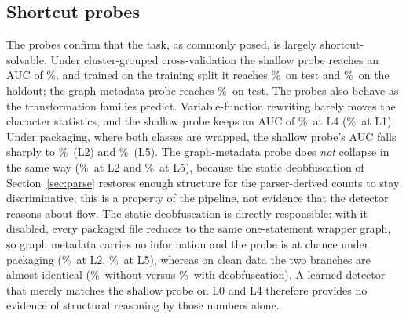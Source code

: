 \documentclass[pdflatex,sn-mathphys-num]{sn-jnl}
\begin{document}
\subsection{Shortcut probes}\label{sec:r-probe}
The probes confirm that the task, as commonly posed, is largely
shortcut-solvable. Under cluster-grouped cross-validation the shallow probe
reaches an AUC of \ProbeShallowAucCV\%, and trained on the training split it
reaches \ProbeShallowAucTest\%\ on test and \ProbeShallowAucHoldout\%\ on the
holdout; the graph-metadata probe reaches \ProbeGraphmetaAucTest\%\ on test. The
probes also behave as the transformation families predict. Variable-function
rewriting barely moves the character statistics, and the shallow probe keeps an
AUC of \ProbeShallowAucLFour\%\ at L4 (\ProbeShallowAucLOne\%\ at L1). Under
packaging, where both classes are wrapped, the shallow probe's AUC falls sharply
to \ProbeShallowAucLTwo\%\ (L2) and \ProbeShallowAucLFive\%\ (L5). The
graph-metadata probe does \emph{not} collapse in the same way
(\ProbeGraphmetaAucLTwo\%\ at L2 and \ProbeGraphmetaAucLFive\%\ at L5), because the
static deobfuscation of Section~\ref{sec:parse} restores enough structure for
the parser-derived counts to stay discriminative; this is a property of the
pipeline, not evidence that the detector reasons about flow. The static
deobfuscation is directly responsible: with it disabled, every packaged file
reduces to the same one-statement wrapper graph, so graph metadata carries no
information and the probe is at chance under packaging
(\ProbeGraphmetaNoDeobfAucLTwo\%\ at L2, \ProbeGraphmetaNoDeobfAucLFive\%\ at L5),
whereas on clean data the two branches are almost identical
(\ProbeGraphmetaNoDeobfAucTest\%\ without versus \ProbeGraphmetaAucTest\%\ with
deobfuscation). A learned detector that merely matches the shallow probe on L0
and L4 therefore provides no evidence of structural reasoning by those numbers
alone.
\end{document}
